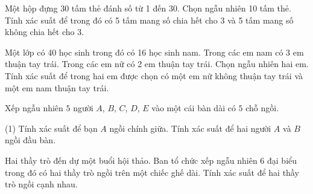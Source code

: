 \begin{vd}
	Một hộp đựng 30 tấm thẻ đánh số từ 1 đến 30. Chọn ngẫu nhiên 10 tấm thẻ. Tính xác suất để trong đó có 5 tấm mang số chia hết cho 3 và 5 tấm mang số không chia hết cho 3.
\end{vd} 
\begin{vd}
	Một lớp có 40 học sinh trong đó có 16 học sinh nam. Trong các em nam có 3 em thuận tay trái. Trong các em nữ có 2 em thuận tay trái. Chọn ngẫu nhiên hai em. Tính xác suất để trong hai em được chọn có một em nữ không thuận tay trái và một em nam thuận tay trái.
\end{vd} 

\begin{vd}%
	Xếp ngẫu nhiên $5$ người $A$, $B$, $C$, $D$, $E$ vào một cái bàn dài có $5$ chỗ ngồi. 
	\begin{tasks}(1)
		\task Tính xác suất để bạn $A$ ngồi chính giữa.
		\task Tính xác suất để hai người $A$ và $B$ ngồi đầu bàn.
	\end{tasks}
\end{vd} 

\begin{vd}
	Hai thầy trò đến dự một buổi hội thảo. Ban tổ chức xếp ngẫu nhiên 6 đại biểu trong đó có hai thầy trò ngồi trên một chiếc ghế dài. Tính xác suất để hai thầy trò ngồi cạnh nhau.
\end{vd} 

